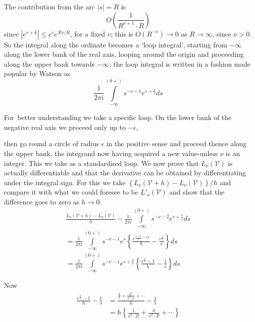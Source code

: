 The contribution from the arc $|s|=R$ is 
$$
O \left( \frac{1}{R^{\nu+1}\cdot R}\right)
$$
since $|e^{s + \frac{\nu}{s}}| \leq e^c e^{\mathscr{R} \nu/R}$, for a
fixed $v$; this is $O (R^{-\nu})\to 0$ as $R \to \infty$, since
$\nu >0$. So the integral along the ordinate becomes a `loop
integral', starting from $- \infty$ along the lower bank of the real
axis, looping around the origin and proceeding along the upper bank
towards $- \infty$; the loop integral is written in a fashion made
popular by Watson as
$$
\frac{1}{2 \pi i} \int\limits^{(0+)}_{- \infty} s^{-\nu -1} e^{s +
  \frac{\nu}{s}} ds
$$

For\pageoriginale\ better understanding we take a specific loop. On
the lower bank of the negative real axis we proceed only up to $-
\epsilon$, 
  \begin{figure}[H]
  \end{figure}
then go round a circle of radius $\epsilon$ in the positive sense and
proceed thence along the upper bank, the integrand now having acquired
a new value-unless $\nu$ is an integer. This we take as a standardised
loop. We now prove that $L_\nu(\mathscr{V})$ is actually
differentiable and that the derivative can be obtained by
differentiating under the integral sign. For this we take $\left\{
L_\nu (\mathscr{V} +h) - L_\nu (\mathscr{V})\right\}/h$ and compare it
with what we could foresee to be $L'_{\nu} (\mathscr{V})$ and show
that the difference goes to zero as $h \to 0$.
\begin{multline*}
  \frac{L_\nu(\mathscr{V} +h)- L_\nu (\mathscr{V})}{h} - \frac{1}{2
    \pi i} \int\limits_{- \infty}^{(0+)} s^{- \nu-2} e^{s +
    \frac{\nu}{s}}ds\\  
  = \frac{1}{2 \pi i} \int\limits^{(0+)}_{-
    \infty} s^{- \nu -1} e^s \left\{ \frac{e^{\frac{v+h}{s} -
      e^{\frac{\nu}{s}}}}{h} - \frac{e^{\frac{\nu}{s}}}{s} \right\}
  ds\\
  = \frac{1}{2 \pi i} \int\limits^{(0+)}_{- \infty} s^{-
    \nu-1}e^{s+ \frac{\nu}{s}} \left\{ \frac{e^{\frac{h}{s}}-1}{h} -
  \frac{1}{s} \right\} ds
\end{multline*}

Now\pageoriginale\ 
\begin{align*}
  \frac{e^{\frac{h}{s}}-1}{h} - \frac{1}{s} & = \frac{\frac{h}{s} +
    \frac{h^2}{s^2 , s!} + \cdots}{h} - \frac{1}{s}\\
  & = h\left\{ \frac{1}{s^2\cdot 2!} + \frac{h}{s^3\cdot 3!} + \cdots
  \right\} 
\end{align*}

